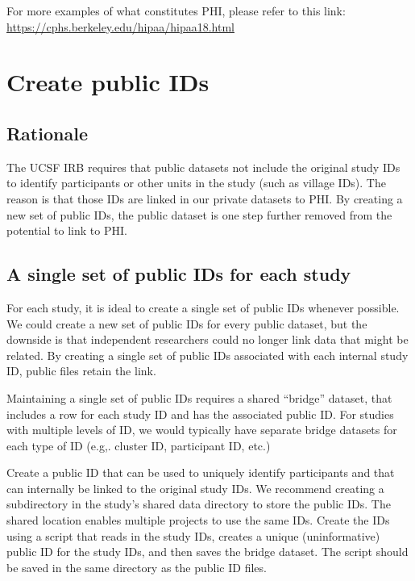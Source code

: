 \documentclass[
]{book}
\begin{document}
For more examples of what constitutes PHI, please refer to this link: \url{https://cphs.berkeley.edu/hipaa/hipaa18.html}

\section{Create public IDs}\label{create-public-ids}

\subsection{Rationale}\label{rationale}

The UCSF IRB requires that public datasets not include the original study IDs to identify participants or other units in the study (such as village IDs). The reason is that those IDs are linked in our private datasets to PHI. By creating a new set of public IDs, the public dataset is one step further removed from the potential to link to PHI.

\subsection{A single set of public IDs for each study}\label{a-single-set-of-public-ids-for-each-study}

For each study, it is ideal to create a single set of public IDs whenever possible. We could create a new set of public IDs for every public dataset, but the downside is that independent researchers could no longer link data that might be related. By creating a single set of public IDs associated with each internal study ID, public files retain the link.

Maintaining a single set of public IDs requires a shared ``bridge'' dataset, that includes a row for each study ID and has the associated public ID. For studies with multiple levels of ID, we would typically have separate bridge datasets for each type of ID (e.g,. cluster ID, participant ID, etc.)

Create a public ID that can be used to uniquely identify participants and that can internally be linked to the original study IDs. We recommend creating a subdirectory in the study's shared data directory to store the public IDs. The shared location enables multiple projects to use the same IDs. Create the IDs using a script that reads in the study IDs, creates a unique (uninformative) public ID for the study IDs, and then saves the bridge dataset. The script should be saved in the same directory as the public ID files.
\end{document}
